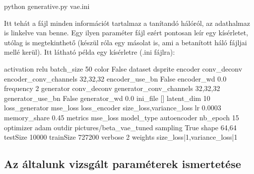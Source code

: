 \lstset{language=sh}
\begin{python}
python generative.py vae.ini
\end{python}

Itt tehát a  fájl minden információt tartalmaz a tanítandó hálóról, az adathalmaz is linkelve van benne. Egy ilyen paraméter fájl ezért pontosan leír egy kísérletet, utólag is megtekinthető (készül róla egy másolat is, ami a betanított háló fájljai mellé kerül). Itt látható példa egy kísérletre (.ini fájlra):

\begin{python}
activation	relu
batch_size	50
color	False
dataset	dsprite
encoder	conv_deconv
encoder_conv_channels   32,32,32
encoder_use_bn	False
encoder_wd	0.0
frequency	2
generator	conv_deconv
generator_conv_channels   32,32,32
generator_use_bn	False
generator_wd	0.0
ini_file	[]
latent_dim	10
loss_generator  mse_loss
loss_encoder    size_loss,variance_loss
lr	0.0003
memory_share	0.45
metrics	mse_loss
model_type	autoencoder
nb_epoch	15
optimizer	adam
outdir	pictures/beta_vae_tuned
sampling	True
shape	64,64
testSize	10000
trainSize	727200
verbose	2
weights size_loss|1,variance_loss|1
\end{python}


\subsection{Az általunk vizsgált paraméterek ismertetése}

